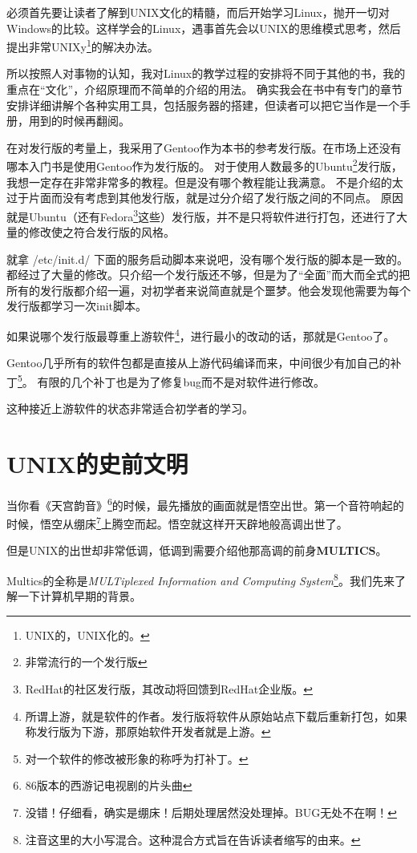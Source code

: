 必须首先要让读者了解到UNIX文化的精髓，而后开始学习Linux，抛开一切对Windows的比较。这样学会的Linux，遇事首先会以UNIX的思维模式思考，然后提出非常UNIXy\footnote{UNIX的，UNIX化的。}的解决办法。

所以按照人对事物的认知，我对Linux的教学过程的安排将不同于其他的书，我的重点在“文化”，介绍原理而不简单的介绍的用法。
确实我会在书中有专门的章节安排详细讲解个各种实用工具，包括服务器的搭建，但读者可以把它当作是一个手册，用到的时候再翻阅。

在对发行版的考量上，我采用了Gentoo作为本书的参考发行版。在市场上还没有哪本入门书是使用Gentoo作为发行版的。
对于使用人数最多的Ubuntu\footnote{非常流行的一个发行版}发行版，我想一定存在非常非常多的教程。但是没有哪个教程能让我满意。
不是介绍的太过于片面而没有考虑到其他发行版，就是过分介绍了发行版之间的不同点。
原因就是Ubuntu（还有Fedora\footnote{RedHat的社区发行版，其改动将回馈到RedHat企业版。}这些）发行版，并不是只将软件进行打包，还进行了大量的修改使之符合发行版的风格。

\begin{notice}
就拿 /etc/init.d/ 下面的服务启动脚本来说吧，没有哪个发行版的脚本是一致的。
都经过了大量的修改。只介绍一个发行版还不够，但是为了“全面”而大而全式的把所有的发行版都介绍一遍，对初学者来说简直就是个噩梦。他会发现他需要为每个发行版都学习一次init脚本。
\end{notice}

如果说哪个发行版最尊重上游软件\footnote{所谓上游，就是软件的作者。发行版将软件从原始站点下载后重新打包，如果称发行版为下游，那原始软件开发者就是上游。}，进行最小的改动的话，那就是Gentoo了。

Gentoo几乎所有的软件包都是直接从上游代码编译而来，中间很少有加自己的补丁\footnote{对一个软件的修改被形象的称呼为打补丁。}。
有限的几个补丁也是为了修复bug而不是对软件进行修改。

这种接近上游软件的状态非常适合初学者的学习。

\section{UNIX的史前文明}

当你看《天宫韵音》\footnote{86版本的西游记电视剧的片头曲}的时候，最先播放的画面就是悟空出世。第一个音符响起的时候，悟空从绷床\footnote{没错！仔细看，确实是绷床！后期处理居然没处理掉。BUG无处不在啊！}上腾空而起。悟空就这样开天辟地般高调出世了。

但是UNIX的出世却非常低调，低调到需要介绍他那高调的前身\textbf{MULTICS}。

Multics的全称是\textit{MULTiplexed Information and Computing System}\footnote{注音这里的大小写混合。这种混合方式旨在告诉读者缩写的由来。}。我们先来了解一下计算机早期的背景。



